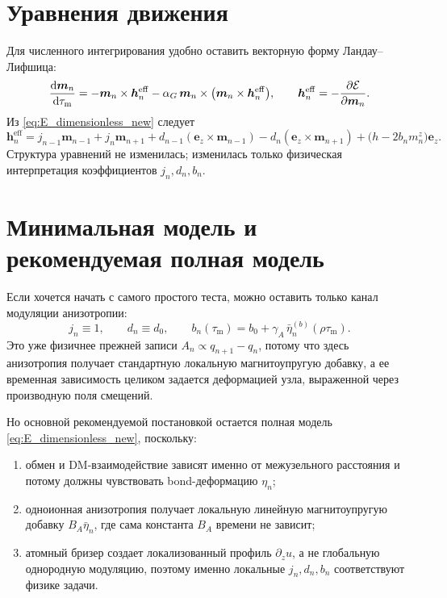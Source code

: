 \documentclass[12pt,a4paper]{article}
\newcommand{\E}{\mathcal{E}}
\newcommand{\m}{\bm{m}}
\newcommand{\ez}{\bm{e}_z}
\newcommand{\tm}{\tau_{\mathrm{m}}}
\begin{document}
\section{Уравнения движения}
Для численного интегрирования удобно оставить векторную форму Ландау--Лифшица:
\begin{equation}
\dv{\m_n}{\tm} = -\m_n\times \bm h_n^{\mathrm{eff}}
-\alpha_G\,\m_n\times\bigl(\m_n\times \bm h_n^{\mathrm{eff}}\bigr),
\qquad
\bm h_n^{\mathrm{eff}}=-\pdv{\E}{\m_n}.
\label{eq:LL_equation_new}
\end{equation}
Из \eqref{eq:E_dimensionless_new} следует
\begin{equation}
\bm h_n^{\mathrm{eff}}=
 j_{n-1}\m_{n-1}+j_n\m_{n+1}
 + d_{n-1}(\ez\times \m_{n-1}) - d_n(\ez\times \m_{n+1})
 + \bigl(h-2b_n m_n^z\bigr)\ez.
\label{eq:heff_new}
\end{equation}
Структура уравнений не изменилась; изменилась только физическая интерпретация коэффициентов $j_n,d_n,b_n$.

\section{Минимальная модель и рекомендуемая полная модель}
Если хочется начать с самого простого теста, можно оставить только канал модуляции анизотропии:
\begin{equation}
j_n\equiv 1,
\qquad d_n\equiv d_0,
\qquad b_n(\tm)=b_0+\gamma_A\,\bar\eta_n^{(b)}(\rho\tm).
\label{eq:minimal_model_new}
\end{equation}
Это уже физичнее прежней записи $A_n\propto q_{n+1}-q_n$, потому что здесь анизотропия получает стандартную локальную магнитоупругую добавку, а ее временная зависимость целиком задается деформацией узла, выраженной через производную поля смещений.

Но основной рекомендуемой постановкой остается полная модель \eqref{eq:E_dimensionless_new}, поскольку:
\begin{enumerate}
    \item обмен и DM-взаимодействие зависят именно от межузельного расстояния и потому должны чувствовать bond-деформацию $\eta_n$;
    \item одноионная анизотропия получает локальную линейную магнитоупругую добавку $B_A\bar\eta_n$, где сама константа $B_A$ времени не зависит;
    \item атомный бризер создает локализованный профиль $\partial_z u$, а не глобальную однородную модуляцию, поэтому именно локальные $j_n,d_n,b_n$ соответствуют физике задачи.
\end{enumerate}
\end{document}
